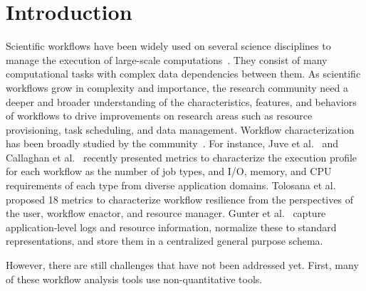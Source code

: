 
\section{Introduction}
\label{intro}

Scientific workflows have been widely used on several science disciplines to manage the execution of large-scale computations~\cite{Deelman2002,Sakellariou2010,Lathers2006,Oinn2004,Wieczorek2005,Maechling2007}. They consist of many computational tasks with complex data dependencies between them. As scientific workflows grow in complexity and importance, the research community need a deeper and broader understanding of the characteristics, features, and behaviors of workflows to drive improvements on research areas such as resource provisioning, task scheduling, and data management. 
Workflow characterization has been broadly studied by the community~\cite{Juve2013, Calasanz2008, Tolosana2011, Callaghan2011, Gunter2011, Yildiz2009, Ramakrishnan2008, Bharathi2008, Gu2013}. For instance, 
Juve et al.~\cite{Juve2013} and Callaghan et al.~\cite{Callaghan2011} recently presented metrics to characterize the execution profile for each workflow as the number of job types, and I/O, memory, and CPU requirements of each type from diverse application domains. Tolosana et al.~\cite{Tolosana2011} proposed 18 metrics to characterize workflow resilience from the perspectives of the user, workflow enactor, and resource manager. Gunter et al.~\cite{Gunter2011} capture application-level logs and resource information, normalize these to standard representations, and store them in a centralized general purpose schema.

However, there are still challenges that have not been addressed yet. First, many of these workflow analysis tools use non-quantitative tools.

